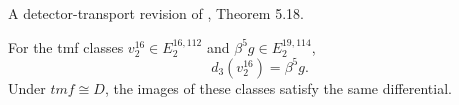 \begin{theorem}
\label{sem:Literature:tmf-d-three}
A detector-transport revision of \cite{BR21}, Theorem 5.18.\par

For the tmf classes $v_2^{16}\in E_2^{16,112}$ and $\beta^5g\in E_2^{19,114}$,
\[d_3(v_2^{16})=\beta^5g.\]
Under $\mathit{tmf}\cong D$, the images of these classes satisfy the same differential.
\end{theorem}

